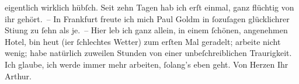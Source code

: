 \begin{ledgroupsized}[t]{13cm}
               eigentlich wirklich hübſch. Seit zehn Tagen hab ich erſt einmal, ganz flüchtig von
                  ihr gehört. – In Frankfurt freute ich mich Paul Goldm in ſozuſagen glücklichrer Sti{\geminationm}ung zu ſehn als je. – Hier leb ich ganz allein, in
               einem ſchönen, angenehmen Hotel,
               bin heut (i{\geminationm}er ſchlechtes Wetter) zum erſten Mal
               geradelt; arbeite nicht wenig; habe natürlich zuweilen Stunden von einer
               unbeſchreiblichen Traurigkeit. Ich glaube, ich werde immer mehr arbeiten, ſolang’s
               eben geht.\pend
           \pstart Von Herzen Ihr \spacefill\mbox{Arthur.}\pend{}
         
         \endnumbering{}\end{ledgroupsized}  \newcommand{\dateiname}{L00983}\newcommand{\titel}{Arthur Schnitzler an Hugo von Hofmannsthal, 29. 9. 1899}\newcommand{\editorInnen}{Martin Anton Müller und Gerd-Hermann Susen}
      